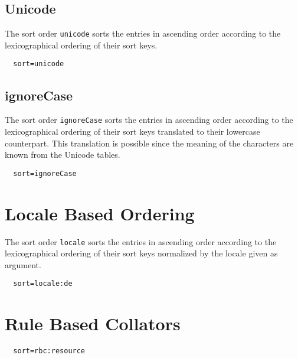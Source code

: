\subsection{Unicode}

The sort order \texttt{unicode} sorts the entries in ascending order
according to the lexicographical ordering of their sort keys.

\begin{verbatim}
  sort=unicode
\end{verbatim}

\subsection{ignoreCase}

The sort order \texttt{ignoreCase} sorts the entries in ascending order
according to the lexicographical ordering of their sort keys
translated to their lowercase counterpart. This translation is
possible since the meaning of the characters are known from the
Unicode tables.

\begin{verbatim}
  sort=ignoreCase
\end{verbatim}

\section{Locale Based Ordering}

The sort order \texttt{locale} sorts the entries in ascending order
according to the lexicographical ordering of their sort keys
normalized by the locale given as argument.

\begin{verbatim}
  sort=locale:de
\end{verbatim}

\section{Rule Based Collators}

\begin{verbatim}
  sort=rbc:resource
\end{verbatim}

\INCOMPLETE




\endinput
%
